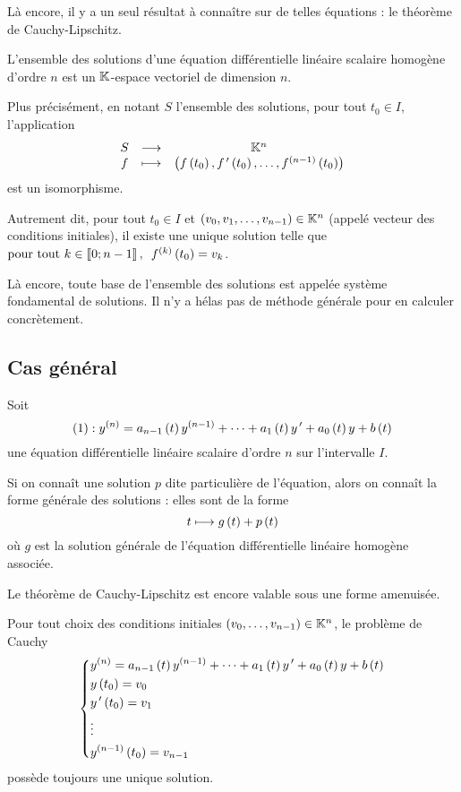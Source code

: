 Là encore, il y a un seul résultat à connaître sur de telles équations : le théorème de Cauchy-Lipschitz.

\begin{theo}
L'ensemble des solutions d'une équation différentielle linéaire scalaire homogène d'ordre \(n\) est un \(\mathbb{K}\)-espace vectoriel de dimension \(n\).

Plus précisément, en notant \(S\) l'ensemble des solutions, pour tout \(t_0\in I\), l'application \[\begin{array}[t]{ccc}S & \longrightarrow & \mathbb{K}^n \\ f & \longmapsto & \left(f\left(t_0\right),f^{\,\prime}\left(t_0\right),\dots,f^{\left(n-1\right)}\left(t_0\right)\right)\end{array}\] est un isomorphisme.

Autrement dit, pour tout \(t_0\in I\) et \(\left(v_0,v_1,\dots,v_{n-1}\right)\in\mathbb{K}^n\) (appelé vecteur des conditions initiales), il existe une unique solution telle que \(\quantifs{\tpt k\in\interventierii{0}{n-1}}f\deriv{k}\paren{t_0}=v_k\).
\end{theo}

Là encore, toute base de l'ensemble des solutions est appelée système fondamental de solutions. Il n'y a hélas pas de méthode générale pour en calculer concrètement.

\subsection{Cas général}

\begin{prop}
Soit \[\left(1\right):y^{\left(n\right)}=a_{n-1}\left(t\right)y^{\left(n-1\right)}+\dots+a_1\left(t\right)y^{\,\prime}+a_0\left(t\right)y+b\left(t\right)\] une équation différentielle linéaire scalaire d'ordre \(n\) sur l'intervalle \(I\).

Si on connaît une solution \(p\) dite particulière de l'équation, alors on connaît la forme générale des solutions : elles sont de la forme \[t\longmapsto g\left(t\right)+p\left(t\right)\] où \(g\) est la solution générale de l'équation différentielle linéaire homogène associée.
\end{prop}

Le théorème de Cauchy-Lipschitz est encore valable sous une forme amenuisée.

\begin{theo}
Pour tout choix des conditions initiales \(\left(v_0,\dots,v_{n-1}\right)\in\mathbb{K}^n\), le problème de Cauchy \[\begin{dcases}
y^{\left(n\right)}=a_{n-1}\left(t\right)y^{\left(n-1\right)}+\dots+a_1\left(t\right)y^{\,\prime}+a_0\left(t\right)y+b\left(t\right) \\
y\left(t_0\right)=v_0 \\
y^{\,\prime}\left(t_0\right)=v_1 \\
\vdots \\
y^{\left(n-1\right)}\left(t_0\right)=v_{n-1}
\end{dcases}\] possède toujours une unique solution.
\end{theo}

